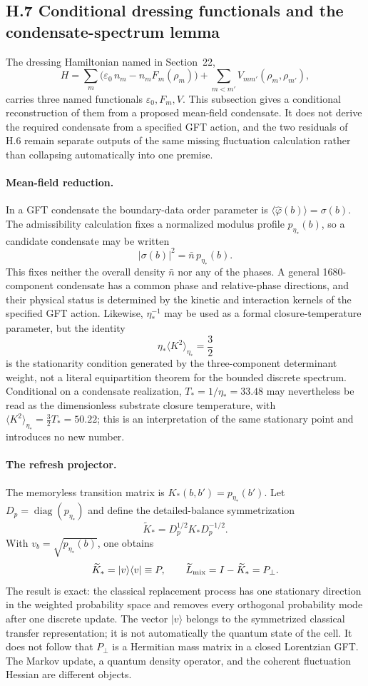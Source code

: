 \documentclass[11pt]{article}
\begin{document}
\subsection*{H.7 Conditional dressing functionals and the condensate-spectrum lemma}

The dressing Hamiltonian named in Section~22,
\[
H=\sum_m\big(\varepsilon_0\,n_m-n_m F_m(\rho_m)\big)+\sum_{m<m'}V_{mm'}(\rho_m,\rho_{m'}),
\]
carries three named functionals $\varepsilon_0,F_m,V$. This subsection gives a conditional reconstruction of them from a proposed mean-field condensate. It does not derive the required condensate from a specified GFT action, and the two residuals of H.6 remain separate outputs of the same missing fluctuation calculation rather than collapsing automatically into one premise.

\paragraph{Mean-field reduction.}
In a GFT condensate the boundary-data order parameter is $\langle\hat\varphi(b)\rangle=\sigma(b)$. The admissibility calculation fixes a normalized modulus profile $p_{\eta_*}(b)$, so a candidate condensate may be written
\[
|\sigma(b)|^2=\bar n\,p_{\eta_*}(b).
\]
This fixes neither the overall density $\bar n$ nor any of the phases. A general 1680-component condensate has a common phase and relative-phase directions, and their physical status is determined by the kinetic and interaction kernels of the specified GFT action. Likewise, $\eta_*^{-1}$ may be used as a formal closure-temperature parameter, but the identity
\[
\eta_*\langle K^2\rangle_{\eta_*}=\frac32
\]
is the stationarity condition generated by the three-component determinant weight, not a literal equipartition theorem for the bounded discrete spectrum. Conditional on a condensate realization, $T_*=1/\eta_*=33.48$ may nevertheless be read as the dimensionless substrate closure temperature, with $\langle K^2\rangle_{\eta_*}=\tfrac32 T_*=50.22$; this is an interpretation of the same stationary point and introduces no new number.

\paragraph{The refresh projector.}
The memoryless transition matrix is $K_*(b,b')=p_{\eta_*}(b')$. Let $D_p=\operatorname{diag}(p_{\eta_*})$ and define the detailed-balance symmetrization
\[
\widetilde K_*=D_p^{1/2}K_*D_p^{-1/2}.
\]
With $v_b=\sqrt{p_{\eta_*}(b)}$, one obtains
\[
\widetilde K_*=|v\rangle\langle v|\equiv P,
\qquad
\widetilde L_{\rm mix}=I-\widetilde K_*=P_\perp.
\]
The result is exact: the classical replacement process has one stationary direction in the weighted probability space and removes every orthogonal probability mode after one discrete update. The vector $|v\rangle$ belongs to the symmetrized classical transfer representation; it is not automatically the quantum state of the cell. It does not follow that $P_\perp$ is a Hermitian mass matrix in a closed Lorentzian GFT. The Markov update, a quantum density operator, and the coherent fluctuation Hessian are different objects.
\end{document}
